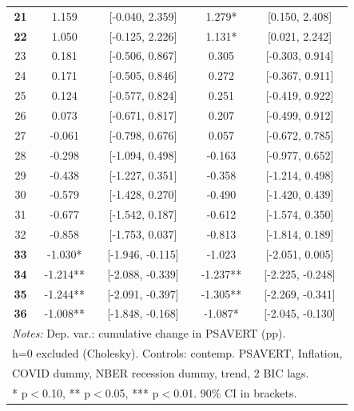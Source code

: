 \begin{table}[htbp]
\begin{tabular}{c cccc}
\textbf{21} & 1.159 & [-0.040, 2.359] & 1.279* & [0.150, 2.408] \\
\textbf{22} & 1.050 & [-0.125, 2.226] & 1.131* & [0.021, 2.242] \\
23 & 0.181 & [-0.506, 0.867] & 0.305 & [-0.303, 0.914] \\
24 & 0.171 & [-0.505, 0.846] & 0.272 & [-0.367, 0.911] \\
25 & 0.124 & [-0.577, 0.824] & 0.251 & [-0.419, 0.922] \\
26 & 0.073 & [-0.671, 0.817] & 0.207 & [-0.499, 0.912] \\
27 & -0.061 & [-0.798, 0.676] & 0.057 & [-0.672, 0.785] \\
28 & -0.298 & [-1.094, 0.498] & -0.163 & [-0.977, 0.652] \\
29 & -0.438 & [-1.227, 0.351] & -0.358 & [-1.214, 0.498] \\
30 & -0.579 & [-1.428, 0.270] & -0.490 & [-1.420, 0.439] \\
31 & -0.677 & [-1.542, 0.187] & -0.612 & [-1.574, 0.350] \\
32 & -0.858 & [-1.753, 0.037] & -0.813 & [-1.814, 0.189] \\
\textbf{33} & -1.030* & [-1.946, -0.115] & -1.023 & [-2.051, 0.005] \\
\textbf{34} & -1.214** & [-2.088, -0.339] & -1.237** & [-2.225, -0.248] \\
\textbf{35} & -1.244** & [-2.091, -0.397] & -1.305** & [-2.269, -0.341] \\
\textbf{36} & -1.008** & [-1.848, -0.168] & -1.087* & [-2.045, -0.130] \\
\midrule
\multicolumn{5}{l}{\textit{Notes:} Dep. var.: cumulative change in PSAVERT (pp).} \\
\multicolumn{5}{l}{h=0 excluded (Cholesky). Controls: contemp. PSAVERT, Inflation,} \\
\multicolumn{5}{l}{COVID dummy, NBER recession dummy, trend, 2 BIC lags.} \\
\multicolumn{5}{l}{* p$<$0.10, ** p$<$0.05, *** p$<$0.01. 90\% CI in brackets.} \\
\bottomrule
\end{tabular}
\end{table}
